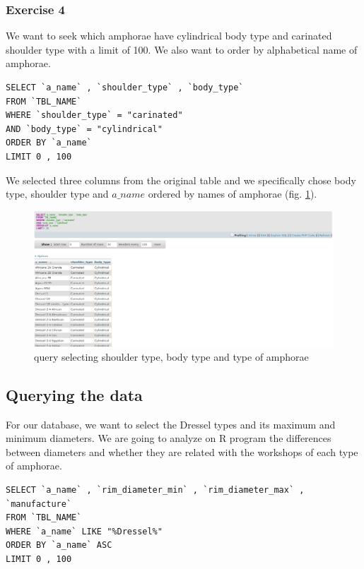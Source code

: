 \documentclass[10pt,a4paper]{article}
\begin{document}
\subsubsection{Exercise 4}

We want to seek which amphorae have cylindrical body type and carinated shoulder type with a limit of 100. We also want to order by alphabetical name of amphorae. 

\begin{verbatim}
SELECT `a_name` , `shoulder_type` , `body_type`
FROM `TBL_NAME`
WHERE `shoulder_type` = "carinated"
AND `body_type` = "cylindrical"
ORDER BY `a_name`
LIMIT 0 , 100
\end{verbatim}

We selected three columns from the original table and we specifically chose body type, shoulder type and $a\_name$ ordered by names of amphorae (fig. \ref{query4}).

\begin{figure}[htp]
\centering
\includegraphics[scale=0.30]{query4.png}
\caption{query selecting shoulder type, body type and type of amphorae}
\label{query4}
\end{figure} 


\subsection{Querying the data}

For our database, we want to select the Dressel types and its maximum and minimum diameters. We are going to analyze on R program the differences between diameters and whether they are related with the workshops of each type of amphorae. 

\begin{verbatim}
SELECT `a_name` , `rim_diameter_min` , `rim_diameter_max` , `manufacture`
FROM `TBL_NAME`
WHERE `a_name` LIKE "%Dressel%"
ORDER BY `a_name` ASC
LIMIT 0 , 100
\end{verbatim}
\end{document}
